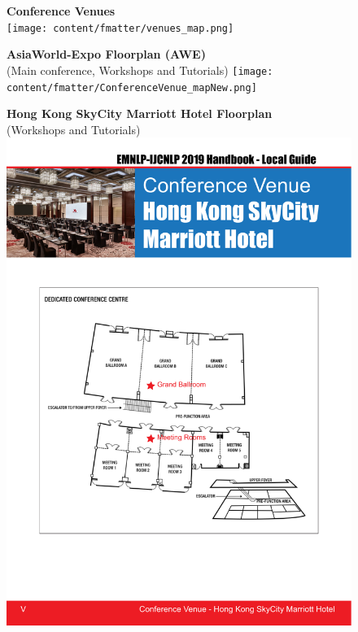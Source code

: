 

\begin{figure}[p]
\centering
\textbf{Conference Venues}\\
\vspace{3em}
\texttt{[image: content/fmatter/venues\_map.png]}
\end{figure}

\begin{figure}[p]
\centering
\textbf{AsiaWorld-Expo Floorplan (AWE)}\\
(Main conference, Workshops and Tutorials)
\vspace{3em}
\texttt{[image: content/fmatter/ConferenceVenue\_mapNew.png]}
\end{figure}

\begin{figure}[p]
\centering
\textbf{Hong Kong SkyCity Marriott Hotel Floorplan}\\
(Workshops and Tutorials)
\vspace{10em}
\includegraphics[width=\textwidth]{content/fmatter/Marriott_map.pdf}
\end{figure}

